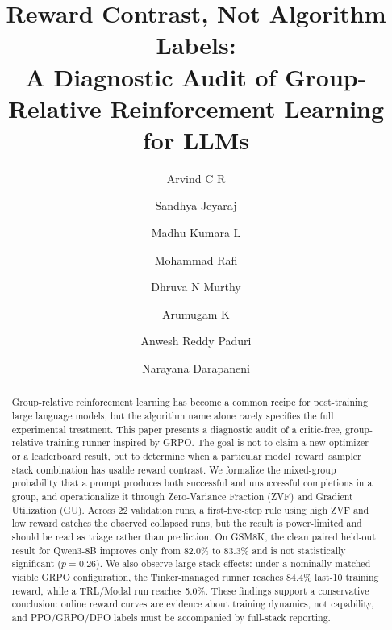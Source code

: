 \documentclass[runningheads,a4paper]{llncs}
\begin{document}
\title{Reward Contrast, Not Algorithm Labels:\\
A Diagnostic Audit of Group-Relative Reinforcement Learning for LLMs}

\author{Arvind C R \and
Sandhya Jeyaraj \and
Madhu Kumara L \and
Mohammad Rafi \and
Dhruva N Murthy \and
Arumugam K \and
Anwesh Reddy Paduri \and
Narayana Darapaneni}


\maketitle

\begin{abstract}
Group-relative reinforcement learning has become a common recipe for post-training large language models, but the algorithm name alone rarely specifies the full experimental treatment. This paper presents a diagnostic audit of a critic-free, group-relative training runner inspired by GRPO. The goal is not to claim a new optimizer or a leaderboard result, but to determine when a particular model--reward--sampler--stack combination has usable reward contrast. We formalize the mixed-group probability that a prompt produces both successful and unsuccessful completions in a group, and operationalize it through Zero-Variance Fraction (ZVF) and Gradient Utilization (GU). Across 22 validation runs, a first-five-step rule using high ZVF and low reward catches the observed collapsed runs, but the result is power-limited and should be read as triage rather than prediction. On GSM8K, the clean paired held-out result for Qwen3-8B improves only from 82.0\% to 83.3\% and is not statistically significant ($p=0.26$). We also observe large stack effects: under a nominally matched visible GRPO configuration, the Tinker-managed runner reaches 84.4\% last-10 training reward, while a TRL/Modal run reaches 5.0\%. These findings support a conservative conclusion: online reward curves are evidence about training dynamics, not capability, and PPO/GRPO/DPO labels must be accompanied by full-stack reporting.

\end{abstract}
\end{document}
